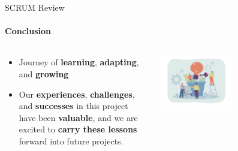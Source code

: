 \documentclass[
ngerman,%
authorontitle=true,
]{bfhbeamer}
\begin{document}
	\begin{frame}{SCRUM Review}
		\framesubtitle{Conclusion}
		\begin{columns} %
			\begin{column}{0.5\textwidth} %
				\begin{itemize}
					\item Journey of \textbf{learning}, \textbf{adapting}, and \textbf{growing}
					\item Our \textbf{experiences}, \textbf{challenges}, and \textbf{successes} in this project have been \textbf{valuable}, and we are excited to \textbf{carry these lessons} forward into future projects.
				\end{itemize}
			\end{column}
			\begin{column}{0.5\textwidth} %
				\includegraphics[width=0.5\textwidth]{pictures/final_presentation/Team growing lightbulb plant}
			\end{column}
		\end{columns} %
	\end{frame}
	
\end{document}
